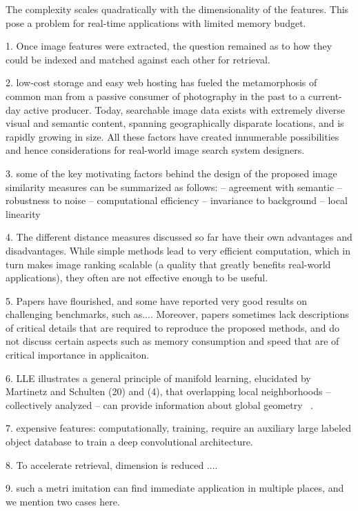 
The complexity scales quadratically with the dimensionality of the
features. This pose a problem for real-time applications with limited
memory budget.


1. Once image features were extracted, the question remained as to how
they could be indexed and matched against each other for retrieval.

2. low-cost storage and easy web hosting has fueled the metamorphosis
of common man from a passive consumer of photography in the past to a
current-day active producer. Today, searchable image data exists with
extremely diverse visual and semantic content, spanning geographically
disparate locations, and is rapidly growing in size. All these factors
have created innumerable possibilities and hence considerations for
real-world image search system designers.

3.  some of the key motivating factors behind the design of the proposed image similarity measures can be summarized as follows: 
-- agreement with semantic --robustness to noise -- computational efficiency -- invariance to background -- local linearity 


4. The different distance measures discussed so far have their own
advantages and disadvantages. While simple methods lead to very
efficient computation, which in turn makes image ranking scalable (a
quality that greatly benefits real-world applications), they often are
not effective enough to be useful. 

5. Papers have flourished, and some have reported very good results on
challenging benchmarks, such as.... Moreover, papers sometimes lack
descriptions of critical details that are required to reproduce the
proposed methods, and do not discuss certain aspects such as memory
consumption and speed that are of critical importance in applicaiton. 


6. LLE illustrates a general principle of manifold learning,
elucidated by Martinetz and Schulten (20) and (4), that overlapping
local neighborhoods -- collectively analyzed -- can provide
information about global geometry ~\cite{lle:science:00}. 

7. expensive features: computationally, training, require an auxiliary
large labeled object database to train a deep convolutional
architecture.

8. To accelerate retrieval, dimension is reduced ....  

9. such a metri imitation can find immediate application in multiple places, and we mention two cases here.  

